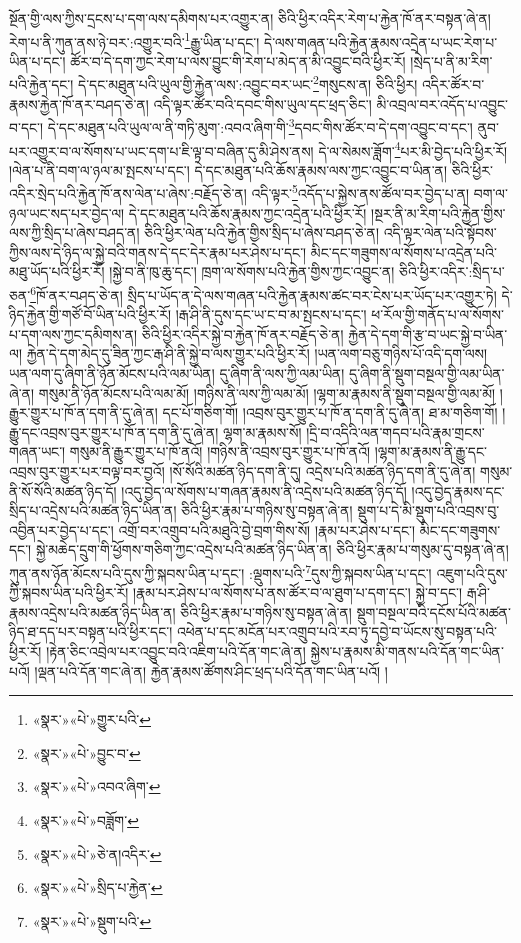 སྔོན་གྱི་ལས་ཀྱིས་དྲངས་པ་དག་ལས་དམིགས་པར་འགྱུར་ན། ཅིའི་ཕྱིར་འདིར་རེག་པ་རྐྱེན་ཁོ་ནར་བསྟན་ཞེ་ན། རེག་པ་ནི་ཀུན་ནས་ཉེ་བར་:འགྱུར་བའི་\footnote{«སྣར་»«པེ་»གྱུར་པའི་}རྒྱུ་ཡིན་པ་དང་། དེ་ལས་གཞན་པའི་རྐྱེན་རྣམས་འདྲེན་པ་ཡང་རེག་པ་ཡིན་པ་དང་། ཚོར་བ་དེ་དག་ཀྱང་རེག་པ་ལས་བྱུང་གི་རེག་པ་མེད་ན་མི་འབྱུང་བའི་ཕྱིར་རོ། །སྲེད་པ་ནི་མ་རིག་པའི་རྐྱེན་དང་། དེ་དང་མཐུན་པའི་ཡུལ་གྱི་རྐྱེན་ལས་:འབྱུང་བར་ཡང་\footnote{«སྣར་»«པེ་»བྱུང་བ་}གསུངས་ན། ཅིའི་ཕྱིར། འདིར་ཚོར་བ་རྣམས་རྐྱེན་ཁོ་ནར་བཤད་ཅེ་ན། འདི་ལྟར་ཚོར་བའི་དབང་གིས་ཡུལ་དང་ཕྲད་ཅིང་། མི་འབྲལ་བར་འདོད་པ་འབྱུང་བ་དང་། དེ་དང་མཐུན་པའི་ཡུལ་ལ་ནི་གཏི་མུག་:འབའ་ཞིག་གི་\footnote{«སྣར་»«པེ་»འབའ་ཞིག་}དབང་གིས་ཚོར་བ་དེ་དག་འབྱུང་བ་དང་། ནུབ་པར་འགྱུར་བ་ལ་སོགས་པ་ཡང་དག་པ་ཇི་ལྟ་བ་བཞིན་དུ་མི་ཤེས་ནས། དེ་ལ་སེམས་ཟློག་\footnote{«སྣར་»«པེ་»བཟློག་}པར་མི་བྱེད་པའི་ཕྱིར་རོ། །ལེན་པ་ནི་བག་ལ་ཉལ་མ་སྤངས་པ་དང་། དེ་དང་མཐུན་པའི་ཆོས་རྣམས་ལས་ཀྱང་འབྱུང་བ་ཡིན་ན། ཅིའི་ཕྱིར་འདིར་སྲེད་པའི་རྐྱེན་ཁོ་ནས་ལེན་པ་ཞེས་:བརྗོད་ཅེ་ན། འདི་ལྟར་\footnote{«སྣར་»«པེ་»ཅེ་ན།འདིར་}འདོད་པ་སྐྱེས་ནས་ཚོལ་བར་བྱེད་པ་ན། བག་ལ་ཉལ་ཡང་སད་པར་བྱེད་ལ། དེ་དང་མཐུན་པའི་ཆོས་རྣམས་ཀྱང་འདྲེན་པའི་ཕྱིར་རོ། །སྔར་ནི་མ་རིག་པའི་རྐྱེན་གྱིས་ལས་ཀྱི་སྲིད་པ་ཞེས་བཤད་ན། ཅིའི་ཕྱིར་ལེན་པའི་རྐྱེན་གྱིས་སྲིད་པ་ཞེས་བཤད་ཅེ་ན། འདི་ལྟར་ལེན་པའི་སྟོབས་ཀྱིས་ལས་དེ་ཉིད་ལ་སྐྱེ་བའི་གནས་དེ་དང་དེར་རྣམ་པར་ཤེས་པ་དང་། མིང་དང་གཟུགས་ལ་སོགས་པ་འདྲེན་པའི་མཐུ་ཡོད་པའི་ཕྱིར་རོ། །སྐྱེ་བ་ནི་ཁུ་ཆུ་དང་། ཁྲག་ལ་སོགས་པའི་རྐྱེན་གྱིས་ཀྱང་འབྱུང་ན། ཅིའི་ཕྱིར་འདིར་:སྲིད་པ་ཅན་\footnote{«སྣར་»«པེ་»སྲིད་པ་རྐྱེན་}ཁོ་ནར་བཤད་ཅེ་ན། སྲིད་པ་ཡོད་ན་དེ་ལས་གཞན་པའི་རྐྱེན་རྣམས་ཚང་བར་ངེས་པར་ཡོད་པར་འགྱུར་ཏེ། དེ་ཉིད་རྐྱེན་གྱི་གཙོ་བོ་ཡིན་པའི་ཕྱིར་རོ། །རྒ་ཤི་ནི་དུས་དང་ཡ་ང་བ་མ་སྤངས་པ་དང་། ཕ་རོལ་གྱི་གནོད་པ་ལ་སོགས་པ་དག་ལས་ཀྱང་དམིགས་ན། ཅིའི་ཕྱིར་འདིར་སྐྱེ་བ་རྐྱེན་ཁོ་ནར་བརྗོད་ཅེ་ན། རྐྱེན་དེ་དག་གི་རྩ་བ་ཡང་སྐྱེ་བ་ཡིན་ལ། རྐྱེན་དེ་དག་མེད་དུ་ཟིན་ཀྱང་རྒ་ཤི་ནི་སྐྱེ་བ་ལས་གྱུར་པའི་ཕྱིར་རོ། །ཡན་ལག་བཅུ་གཉིས་པོ་འདི་དག་ལས། ཡན་ལག་དུ་ཞིག་ནི་ཉོན་མོངས་པའི་ལམ་ཡིན། དུ་ཞིག་ནི་ལས་ཀྱི་ལམ་ཡིན། དུ་ཞིག་ནི་སྡུག་བསྔལ་གྱི་ལམ་ཡིན་ཞེ་ན། གསུམ་ནི་ཉོན་མོངས་པའི་ལམ་མོ། །གཉིས་ནི་ལས་ཀྱི་ལམ་མོ། །ལྷག་མ་རྣམས་ནི་སྡུག་བསྔལ་གྱི་ལམ་མོ། །རྒྱུར་གྱུར་པ་ཁོ་ན་དག་ནི་དུ་ཞེ་ན། དང་པོ་གཅིག་གོ། །འབྲས་བུར་གྱུར་པ་ཁོ་ན་དག་ནི་དུ་ཞེ་ན། ཐ་མ་གཅིག་གོ། །རྒྱུ་དང་འབྲས་བུར་གྱུར་པ་ཁོ་ན་དག་ནི་དུ་ཞེ་ན། ལྷག་མ་རྣམས་སོ། །དྲི་བ་འདིའི་ལན་གདབ་པའི་རྣམ་གྲངས་གཞན་ཡང་། གསུམ་ནི་རྒྱུར་གྱུར་པ་ཁོ་ནའོ། །གཉིས་ནི་འབྲས་བུར་གྱུར་པ་ཁོ་ནའོ། །ལྷག་མ་རྣམས་ནི་རྒྱུ་དང་འབྲས་བུར་གྱུར་པར་བལྟ་བར་བྱའོ། །སོ་སོའི་མཚན་ཉིད་དག་ནི་དུ། འདྲེས་པའི་མཚན་ཉིད་དག་ནི་དུ་ཞེ་ན། གསུམ་ནི་སོ་སོའི་མཚན་ཉིད་དོ། །འདུ་བྱེད་ལ་སོགས་པ་གཞན་རྣམས་ནི་འདྲེས་པའི་མཚན་ཉིད་དོ། །འདུ་བྱེད་རྣམས་དང་སྲིད་པ་འདྲེས་པའི་མཚན་ཉིད་ཡིན་ན། ཅིའི་ཕྱིར་རྣམ་པ་གཉིས་སུ་བསྟན་ཞེ་ན། སྡུག་པ་དེ་མི་སྡུག་པའི་འབྲས་བུ་འབྱིན་པར་བྱེད་པ་དང་། འགྲོ་བར་འགྲུབ་པའི་མཐུའི་བྱེ་བྲག་གིས་སོ། །རྣམ་པར་ཤེས་པ་དང་། མིང་དང་གཟུགས་དང་། སྐྱེ་མཆེད་དྲུག་གི་ཕྱོགས་གཅིག་ཀྱང་འདྲེས་པའི་མཚན་ཉིད་ཡིན་ན། ཅིའི་ཕྱིར་རྣམ་པ་གསུམ་དུ་བསྟན་ཞེ་ན། ཀུན་ནས་ཉོན་མོངས་པའི་དུས་ཀྱི་སྐབས་ཡིན་པ་དང་། :ལྡུགས་པའི་\footnote{«སྣར་»«པེ་»སྡུག་པའི་}དུས་ཀྱི་སྐབས་ཡིན་པ་དང་། འཇུག་པའི་དུས་ཀྱི་སྐབས་ཡིན་པའི་ཕྱིར་རོ། །རྣམ་པར་ཤེས་པ་ལ་སོགས་པ་ནས་ཚོར་བ་ལ་ཐུག་པ་དག་དང་། སྐྱེ་བ་དང་། རྒ་ཤི་རྣམས་འདྲེས་པའི་མཚན་ཉིད་ཡིན་ན། ཅིའི་ཕྱིར་རྣམ་པ་གཉིས་སུ་བསྟན་ཞེ་ན། སྡུག་བསྔལ་བའི་དངོས་པོའི་མཚན་ཉིད་ཐ་དད་པར་བསྟན་པའི་ཕྱིར་དང་། འཕེན་པ་དང་མངོན་པར་འགྲུབ་པའི་རབ་ཏུ་དབྱེ་བ་ཡོངས་སུ་བསྟན་པའི་ཕྱིར་རོ། །རྟེན་ཅིང་འབྲེལ་པར་འབྱུང་བའི་འཇིག་པའི་དོན་གང་ཞེ་ན། སྐྱེས་པ་རྣམས་མི་གནས་པའི་དོན་གང་ཡིན་པའོ། །ལྡན་པའི་དོན་གང་ཞེ་ན། རྐྱེན་རྣམས་ཚོགས་ཤིང་ཕྲད་པའི་དོན་གང་ཡིན་པའོ། །
